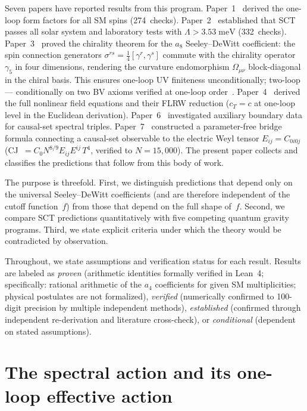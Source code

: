 \documentclass[12pt,a4paper]{article}
\theoremstyle{plain}
\theoremstyle{definition}
\theoremstyle{remark}
\newcommand{\Esq}{E_{ij}E^{ij}}
\begin{document}
Seven papers have reported results from this program.
Paper~1~\cite{Alfyorov:2026paper1} derived the one-loop form
factors for all SM spins (274~checks).
Paper~2~\cite{Alfyorov:2026paper2} established that SCT passes
all solar system and laboratory tests with
$\Lambda > 3.53\;\mathrm{meV}$ (332~checks).
Paper~3~\cite{Alfyorov:2026paper3} proved the chirality theorem
for the $a_8$ Seeley--DeWitt coefficient: the spin connection
generators $\sigma^{rs} = \frac{1}{4}[\gamma^r, \gamma^s]$
commute with the chirality operator $\gamma_5$ in four
dimensions, rendering the curvature endomorphism
$\Omega_{\mu\nu}$ block-diagonal in the chiral basis.
This ensures one-loop UV finiteness unconditionally; two-loop
--- conditionally on two BV axioms verified at one-loop
order~\cite{Alfyorov:2026paper3}.
Paper~4~\cite{Alfyorov:2026paper4} derived the full nonlinear
field equations and their FLRW reduction ($c_T = c$ at one-loop
level in the Euclidean derivation).
Paper~6~\cite{Alfyorov:2026paper6} investigated auxiliary
boundary data for causal-set spectral triples.
Paper~7~\cite{Alfyorov:2026paper7} constructed a parameter-free
bridge formula connecting a causal-set observable to the electric
Weyl tensor $E_{ij} = C_{0i0j}$
(CJ~$= C_0 N^{8/9} \Esq\, T^4$, verified to
$N = 15{,}000$).  The present paper collects and classifies the
predictions that follow from this body of work.

The purpose is threefold.  First, we distinguish predictions
that depend only on the universal Seeley--DeWitt coefficients
(and are therefore independent of the cutoff function~$f$) from
those that depend on the full shape of~$f$.  Second, we compare
SCT predictions quantitatively with five competing quantum
gravity programs.  Third, we state explicit criteria under which
the theory would be contradicted by observation.

Throughout, we state assumptions and verification status for
each result.  Results are labeled as \emph{proven} (arithmetic identities formally
verified in Lean~4; specifically: rational arithmetic of the $a_4$
coefficients for given SM multiplicities; physical postulates are
not formalized), \emph{verified}
(numerically confirmed to 100-digit precision by multiple
independent methods), \emph{established} (confirmed through
independent re-derivation and literature cross-check), or \emph{conditional}
(dependent on stated assumptions).

\section{The spectral action and its one-loop effective action}
\label{sec:action}
\end{document}
